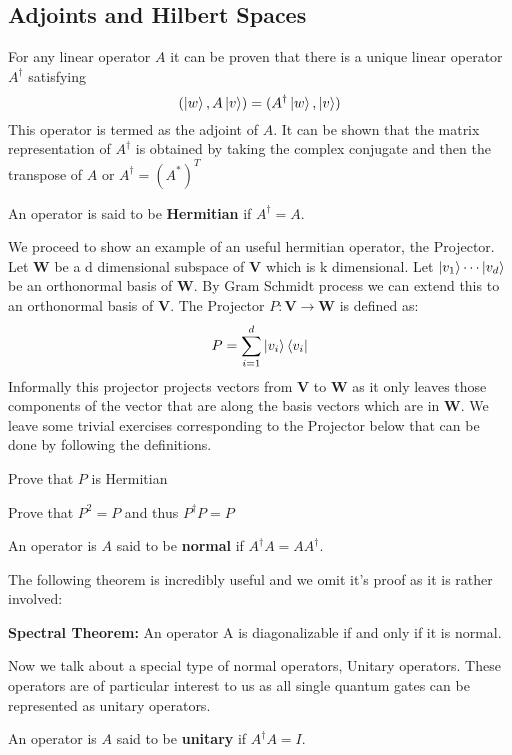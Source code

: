 \subsection{Adjoints and Hilbert Spaces}

For any linear operator $A$ it can be proven that there is a unique linear operator $A^{\dagger}$ satisfying 
$$ (\ket{w}, A\ket{v}) = (A^{\dagger}\ket{w}, \ket{v})$$
This operator is termed as the adjoint of $A$.
It can be shown that the matrix representation of $A^\dagger$ is obtained by taking the complex conjugate and then the transpose of $A$ or $A^\dagger = (A^*)^T$

\begin{definition}
An operator is said to be \textbf{Hermitian} if $A^\dagger = A$.
\end{definition}
We proceed to show an example of an useful hermitian operator, the Projector.
Let $\textbf{W}$ be a d dimensional subspace of $\textbf{V}$ which is k dimensional. Let $\ket{v_1} \cdots \ket{v_d}$ be an orthonormal basis of $\textbf{W}$. By Gram Schmidt process we can extend this to an orthonormal basis of $\textbf{V}$.
The Projector $P: \textbf{V} \rightarrow \textbf{W}$ is defined as:
$$P = \sum_{i=1}^{d} \ket{v_i}\bra{v_i}$$
Informally this projector projects vectors from $\textbf{V}$ to $\textbf{W}$ as it only leaves those components of the vector that are along the basis vectors which are in $\textbf{W}$. We leave some trivial exercises corresponding to the Projector below that can be done by following the definitions.

\begin{exercise}
Prove that $P$ is Hermitian
\end{exercise}
\begin{exercise}
Prove that $P^2 = P$ and thus $P^\dagger P = P$
\end{exercise}
\begin{definition}
An operator is $A$ said to be \textbf{normal} if $A^\dagger A  = AA^\dagger$.
\end{definition}
The following theorem is incredibly useful and we omit it's proof as it is rather involved:
\begin{theorem}
\textbf{Spectral Theorem:} An operator A is diagonalizable if and only if it is normal.
\end{theorem}

Now we talk about a special type of normal operators, Unitary operators. These operators are of particular interest to us as all single quantum gates can be represented as unitary operators. 
\begin{definition}
An operator is $A$ said to be \textbf{unitary} if $A^\dagger A  = I$.
\end{definition}

